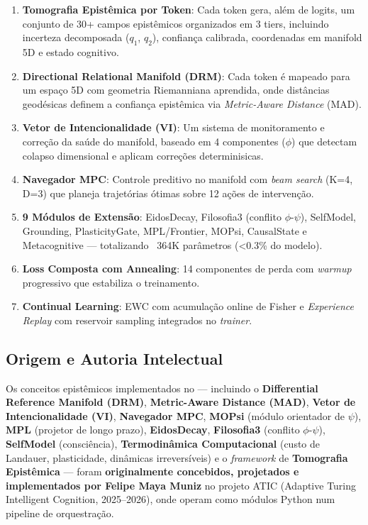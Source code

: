 \begin{enumerate}
    \item \textbf{Tomografia Epist\^emica por Token}: Cada token gera, al\'em de
    logits, um conjunto de 30+ campos epist\^emicos organizados em 3 tiers,
    incluindo incerteza decomposada ($q_1$, $q_2$), confian\c{c}a calibrada,
    coordenadas em manifold 5D e estado cognitivo.

    \item \textbf{Directional Relational Manifold (DRM)}: Cada token \'e
    mapeado para um espa\c{c}o 5D com geometria Riemanniana aprendida, onde
    dist\^ancias geod\'esicas definem a confian\c{c}a epist\^emica via
    \textit{Metric-Aware Distance} (MAD).

    \item \textbf{Vetor de Intencionalidade (VI)}: Um sistema de monitoramento
    e corre\c{c}\~ao da sa\'ude do manifold, baseado em 4 componentes ($\phi$)
    que detectam colapso dimensional e aplicam corre\c{c}\~oes determinisicas.

    \item \textbf{Navegador MPC}: Controle preditivo no manifold com
    \textit{beam search} (K=4, D=3) que planeja trajet\'orias \'otimas sobre
    12 a\c{c}\~oes de interven\c{c}\~ao.

    \item \textbf{9 M\'odulos de Extens\~ao}: EidosDecay, Filosofia3 (conflito
    $\phi$-$\psi$), SelfModel, Grounding, PlasticityGate, MPL/Frontier,
    MOPsi, CausalState e Metacognitive --- totalizando ~364K par\^ametros
    (<0.3\% do modelo).

    \item \textbf{Loss Composta com Annealing}: 14 componentes de perda com
    \textit{warmup} progressivo que estabiliza o treinamento.

    \item \textbf{Continual Learning}: EWC com acumula\c{c}\~ao online de Fisher
    e \textit{Experience Replay} com reservoir sampling integrados no
    \textit{trainer}.
\end{enumerate}

\subsection{Origem e Autoria Intelectual}

Os conceitos epist\^emicos implementados no \aletheion{} --- incluindo o
\textbf{Differential Reference Manifold (DRM)}, \textbf{Metric-Aware Distance (MAD)},
\textbf{Vetor de Intencionalidade (VI)}, \textbf{Navegador MPC},
\textbf{MOPsi} (m\'odulo orientador de $\psi$), \textbf{MPL} (projetor de longo prazo),
\textbf{EidosDecay}, \textbf{Filosofia3} (conflito $\phi$-$\psi$),
\textbf{SelfModel} (consci\^encia), \textbf{Termodin\^amica Computacional}
(custo de Landauer, plasticidade, din\^amicas irrevers\'iveis) e o
\textit{framework} de \textbf{Tomografia Epist\^emica} --- foram
\textbf{originalmente concebidos, projetados e implementados por Felipe Maya Muniz}
no projeto ATIC (Adaptive Turing Intelligent Cognition, 2025--2026), onde operam
como m\'odulos Python num pipeline de orquestra\c{c}\~ao.

